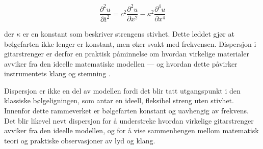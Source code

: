 \begin{equation*}
\frac{\partial^2 u}{\partial t^2} = c^2 \frac{\partial^2 u}{\partial x^2} - \kappa^2 \frac{\partial^4 u}{\partial x^4}
\end{equation*}

der $\kappa$ er en konstant som beskriver strengens stivhet.  
Dette leddet gjør at bølgefarten ikke lenger er konstant, men øker svakt med frekvensen.  
Dispersjon i gitarstrenger er derfor en praktisk påminnelse om hvordan virkelige materialer avviker fra den ideelle matematiske modellen — og hvordan dette påvirker instrumentets klang og stemning \parencite{kartofelev2019dispersive, unswStringsHarmonics, wikipediaInharmonicity}.

Dispersjon er ikke en del av modellen fordi det blir tatt utgangspunkt i den klassiske bølgeligningen, som antar en ideell, fleksibel streng uten stivhet.
Innenfor dette rammeverket er bølgefarten konstant og uavhengig av frekvens.
Det blir likevel nevt dispersjon for å understreke hvordan virkelige gitarstrenger avviker fra den ideelle modellen, og for å vise sammenhengen mellom matematisk teori og praktiske observasjoner av lyd og klang.

